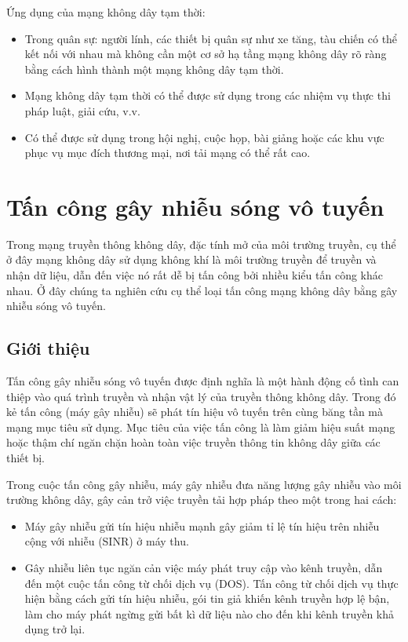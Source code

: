 \documentclass{uetgraduation}
\begin{document}
\begin{itemize}
    Ứng dụng của mạng không dây tạm thời:
    \begin{itemize}
        \item Trong quân sự: người lính, các thiết bị quân sự như xe tăng, tàu chiến có thể kết nối với nhau mà không cần một cơ sở hạ tầng mạng không dây rõ ràng
        bằng cách hình thành một mạng không dây tạm thời.
        \item Mạng không dây tạm thời có thể được sử dụng trong các nhiệm vụ thực thi pháp luật, giải cứu, v.v.
        \item Có thể được sử dụng trong hội nghị, cuộc họp, bài giảng hoặc các khu vực phục vụ mục đích thương mại, nơi tải mạng có thể rất cao.
    \end{itemize}
\end{itemize}


\section{Tấn công gây nhiễu sóng vô tuyến}
Trong mạng truyền thông không dây, đặc tính mở của môi trường truyền, cụ thể ở đây mạng không dây sử dụng không khí là môi trường truyền để truyền và nhận dữ
liệu, dẫn đến việc nó rất dễ bị tấn công bởi nhiều kiểu tấn công khác nhau. Ở đây chúng ta nghiên cứu cụ thể loại tấn công mạng không dây bằng gây nhiễu sóng
vô tuyến.

\subsection{Giới thiệu}
Tấn công gây nhiễu sóng vô tuyến được định nghĩa là một hành động cố tình can thiệp vào quá trình truyền và nhận vật lý của truyền thông
không dây. Trong đó kẻ tấn công (máy gây nhiễu) sẽ phát tín hiệu vô tuyến trên cùng băng tần mà mạng mục tiêu sử dụng. Mục tiêu của việc
tấn công là làm giảm hiệu suất mạng hoặc thậm chí ngăn chặn hoàn toàn việc truyền thông tin không dây giữa các thiết bị.

Trong cuộc tấn công gây nhiễu, máy gây nhiễu đưa năng lượng gây nhiễu vào môi trường không dây, gây cản trở việc truyền tải hợp pháp theo
một trong hai cách: 
\begin{itemize}
    \item Máy gây nhiễu gửi tín hiệu nhiễu mạnh gây giảm tỉ lệ tín hiệu trên nhiễu cộng với nhiễu (SINR) ở máy thu.
    \item Gây nhiễu liên tục ngăn cản việc máy phát truy cập vào kênh truyền, dẫn đến một cuộc tấn công từ chối dịch vụ (DOS). Tấn công từ
    chối dịch vụ thực hiện bằng cách gửi tín hiệu nhiễu, gói tin giả khiến kênh truyền hợp lệ bận, làm cho máy phát ngừng gửi bất kì dữ liệu nào
    cho đến khi kênh truyền khả dụng trở lại.
\end{itemize}
\end{document}
